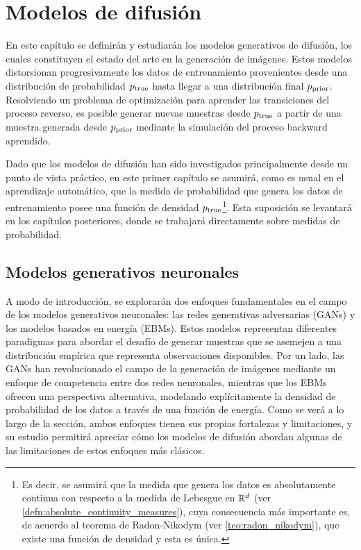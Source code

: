 \chapter{Modelos de difusión}
\label{dm}

En este capítulo se definirán y estudiarán los modelos generativos de difusión, los cuales constituyen el estado del arte en la generación de imágenes. Estos modelos distorsionan progresivamente los datos de entrenamiento provenientes desde una distribución de probabilidad $p_{\operatorname{true}}$ hasta llegar a una distribución final $p_{\operatorname{prior}}$. Resolviendo un problema de optimización para aprender las transiciones del proceso reverso, es posible generar nuevas muestras desde $p_{\operatorname{true}}$ a partir de una muestra generada desde $p_{\operatorname{prior}}$ mediante la simulación del proceso backward aprendido.

Dado que los modelos de difusión han sido investigados principalmente desde un punto de vista práctico, en este primer capítulo se asumirá, como es usual en el aprendizaje automático, que la medida de probabilidad que genera los datos de entrenamiento posee una función de densidad $p_{\operatorname{true}}$\footnote{Es decir, se asumirá que la medida que genera los datos es absolutamente continua con respecto a la medida de Lebesgue en $\mathbb{R}^d$ (ver \autoref{defn:absolute_continuity_measures}), cuya consecuencia más importante es, de acuerdo al teorema de Radon-Nikodym (ver \autoref{teo:radon_nikodym}), que existe una función de densidad y esta es única.}. Esta suposición se levantará en los capítulos posteriores, donde se trabajará directamente sobre medidas de probabilidad.

\section{Modelos generativos neuronales}
\label{dm/generative_models}

A modo de introducción, se explorarán dos enfoques fundamentales en el campo de los modelos generativos neuronales: las redes generativas adversarias (GANs) y los modelos basados en energía (EBMs). Estos modelos representan diferentes paradigmas para abordar el desafío de generar muestras que se asemejen a una distribución empírica que representa observaciones disponibles. Por un lado, las GANs han revolucionado el campo de la generación de imágenes mediante un enfoque de competencia entre dos redes neuronales, mientras que los EBMs ofrecen una perspectiva alternativa, modelando explícitamente la densidad de probabilidad de los datos a través de una función de energía. Como se verá a lo largo de la sección, ambos enfoques tienen sus propias fortalezas y limitaciones, y su estudio permitirá apreciar cómo los modelos de difusión abordan algunas de las limitaciones de estos enfoques más clásicos.

